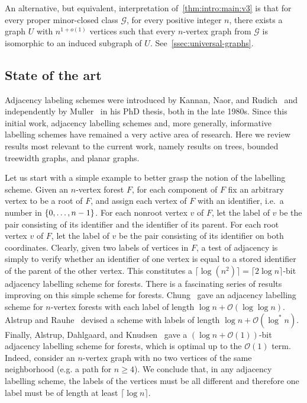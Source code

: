 \documentclass{patmorin}
\renewcommand{\geq}{\geqslant}
\newcommand{\calG}{\mathcal{G}}
\newcommand{\Oh}{\mathcal{O}}
\DeclarePairedDelimiter\set{\{}{\}}
\begin{document}
An alternative, but equivalent, interpretation of~\cref{thm:intro:main:v3} is that
for every proper minor-closed class $\calG$,
for every positive integer $n$,
there exists a graph $U$ with $n^{1+o(1)}$ vertices such that every $n$-vertex graph from $\calG$ is isomorphic to an induced subgraph of $U$.
See~\cref{ssec:universal-graphs}.
\subsection{State of the art}
\label{ssec:state-of-art}
Adjacency labeling schemes were introduced by Kannan, Naor, and Rudich~\cite{kannan.naor.ea:implicit0,kannan.naor.ea:implicit} and independently by Muller~\cite{muller:local} in his PhD thesis, both in the late 1980s.
Since this initial work, adjacency labelling schemes and, more generally, informative labelling schemes have remained a very active area of research.
Here we review results most relevant to the current work, namely results on trees, bounded treewidth graphs, and planar
graphs.

Let us start with a simple example to better grasp the notion of the labelling scheme.
Given an $n$-vertex forest $F$,
for each component of $F$ fix an arbitrary vertex to be a root of $F$, and assign each vertex of $F$ with an identifier, i.e.\ a number in $\set{0,\ldots,n-1}$.
For each nonroot vertex $v$ of $F$,
let the label of $v$ be
the pair consisting of its identifier and the identifier of its parent.
For each root vertex $v$ of $F$,
let the label of $v$ be
the pair consisting of its identifier on both coordinates.
Clearly, given two labels of vertices in $F$,
a test of adjacency is simply to verify whether an identifier of one vertex is equal to a stored identifier of the parent of the other vertex.
This constitutes a $\lceil\log(n^2)\rceil=\lceil2\log n\rceil$-bit adjacency labelling scheme for forests.
There is a fascinating series of results improving on this simple scheme for forests. Chung~\cite{chung:universal} gave an adjacency labelling scheme for $n$-vertex forests with each label of length $\log n +\Oh(\log\log n)$.
Alstrup and Rauhe~\cite{alstrup.rauhe:improved} devised a scheme with labels of length $\log n+\Oh(\log^*n)$.
Finally, Alstrup, Dahlgaard, and Knudsen~\cite{alstrup.dahlgaard.ea:optimal} gave a $(\log n + \Oh(1))$-bit adjacency labelling scheme for forests, which is optimal up to the $\Oh(1)$ term.
Indeed, consider an $n$-vertex graph with no two vertices of the same neighborhood (e.g. a path for $n\geq4$).
We conclude that, in any adjacency labelling scheme,
the labels of the vertices must be all different and therefore one label must be of length at least $\lceil\log n\rceil$.
\end{document}
